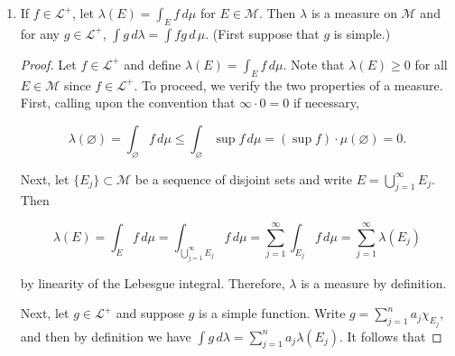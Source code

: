 \documentclass[11pt,oneside,english]{amsart}
\theoremstyle{definition}
\newcommand{\lom}[2]{\lim_{{#1}\rightarrow{#2}}}
\newcommand{\MC}[1]{\mathcal{#1}}
\begin{document}
\begin{enumerate}
\begin{proof}
\[
\limsup_{n\rightarrow\infty}\int_E f_n \leq \int_E f.
\]

Consequently,

\[
\limsup_{n\rightarrow\infty}\int_E f_n \leq \int_E f\leq \liminf_{n\rightarrow\infty} \int_E f_n
\]

and so $\displaystyle \lom{n}{\infty} \int_E f_n=\int _E f$.

To show that we need $\int f=\lim \int f_n<\infty$ for the result above to hold, we construct a counterexample where $\int f=\lim \int f_n=\infty$ and $\lim\int_E f_n\neq\int_E f$. Consider the sequence of functions $f_n=\chi_{E_n}$ where $E_n=(-\infty,0)\cup[n,n+1)$. $f_n\rightarrow 0$ pointwise as $n\rightarrow\infty$ and by the MCT we have

\[
\int_X f=\int_X \lom{n}{\infty}f_n=\lom{n}{\infty}\int_X f_n=\lom{n}{\infty}\int_X \chi_{E_n}=\lom{n}{\infty}\int_{E_n}1=\lom{n}{\infty}\int_{(-\infty,0)\cup[n,n+1)}1=\infty.
\]

But $\displaystyle \int_{[0,\infty)}f=0$ and $\displaystyle \int_{[0,\infty)}f_n=1$ for all $n$ so $\displaystyle \lom{n}{\infty} \int_{[0,\infty)} f_n=1\neq 0$.

\end{proof}

\item If $f\in\MC{L}^+$, let $\lambda(E)=\int_Ef\,d\mu$ for $E\in\MC{M}$. Then $\lambda$ is a measure on $\MC{M}$ and for any $g\in\MC{L}^+$, $\int g\,d\lambda=\int fg\,d\,\mu$. (First suppose that $g$ is simple.)

\begin{proof}
Let $f\in\MC{L}^+$ and define $\lambda(E)=\int_Ef\,d\mu$. Note that $\lambda(E)\geq0$ for all $E\in\MC{M}$ since $f\in\MC{L}^+$. To proceed, we verify the two properties of a measure. First, calling upon the convention that $\infty\cdot0=0$ if necessary,

\[
\lambda(\varnothing)=\int_\varnothing f\,d\mu\leq\int_\varnothing\sup f\,d\mu=(\sup f)\cdot\mu(\varnothing)=0.
\]

Next, let $\{E_j\}\subset\MC{M}$ be a sequence of disjoint sets and write $\displaystyle E=\bigcup_{j=1}^\infty E_j$. Then

\[
\lambda(E)=\int_Ef\,d\mu=\int_{\bigcup_{j=1}^\infty E_j}f\,d\mu=\sum_{j=1}^\infty \int_{E_j}f\,d\mu=\sum_{j=1}^\infty\lambda(E_j)
\]

by linearity of the Lebesgue integral. Therefore, $\lambda$ is a measure by definition.

Next, let $g\in\MC{L}^+$ and suppose $g$ is a simple function. Write $g=\sum_{j=1}^n a_j\chi_{E_j}$, and then by definition we have $\int g\,d\lambda=\sum_{j=1}^na_j\lambda(E_j)$. It follows that


\end{proof}
\end{enumerate}
\end{document}
